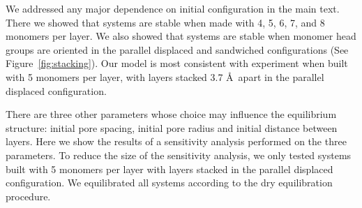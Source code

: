 \documentclass{article}
\begin{document}
  \vspace{1em}
  We addressed any major dependence on initial configuration in the main text.
  There we showed that systems are stable when made with 4, 5, 6, 7, and 8
  monomers per layer. We also showed that systems are stable when monomer head
  groups are oriented in the parallel displaced and sandwiched configurations
  (See Figure~\ref{fig:stacking}). Our model is most consistent with experiment
  when built with 5 monomers per layer, with layers stacked 3.7 \AA~apart in 
  the parallel displaced configuration. 

  There are three other parameters whose choice may influence the equilibrium
  structure: initial pore spacing, initial pore radius and initial distance
  between layers. Here we show the results of a sensitivity analysis performed
  on the three parameters. To reduce the size of the sensitivity analysis, we
  only tested systems built with 5 monomers per layer with layers stacked in 
  the parallel displaced configuration. We equilibrated all systems according
  to the dry equilibration procedure.
\end{document}
